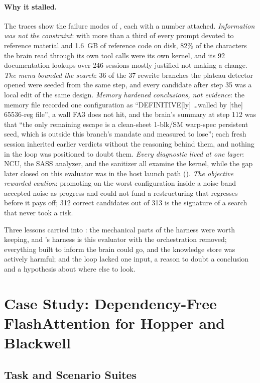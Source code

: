\paragraph{Why it stalled.} The traces show the failure modes of , each with a
number attached. \emph{Information was not the constraint}: with more than a third of every prompt
devoted to reference material and 1.6~GB of reference code on disk, 82\% of the characters the brain
read through its own tool calls were its own kernel, and its 92 documentation lookups over 246
sessions mostly justified not making a change. \emph{The menu bounded the search}: 36 of the 37
rewrite branches the plateau detector opened were seeded from the same step, and every candidate
after step 35 was a local edit of the same design. \emph{Memory hardened conclusions, not evidence}:
the memory file recorded one configuration as ``DEFINITIVE[ly] \ldots walled by [the] 65536-reg
file'', a wall FA3 does not hit, and the brain's summary at step 112 was that ``the only remaining
escape is a clean-sheet 1-blk/SM warp-spec persistent seed, which is outside this branch's mandate
and measured to lose''; each fresh session inherited earlier verdicts without the reasoning behind
them, and nothing in the loop was positioned to doubt them. \emph{Every diagnostic lived at one
layer}: NCU, the SASS analyzer, and the sanitizer all examine the kernel, while the gap \KernelSeek later
closed on this evaluator was in the host launch path (). \emph{The objective
rewarded caution}: promoting on the worst configuration inside a noise band accepted noise as
progress and could not fund a restructuring that regresses before it pays off; 312 correct
candidates out of 313 is the signature of a search that never took a risk.

Three lessons carried into \KernelSeek: the mechanical parts of the harness were worth keeping, and
\KernelSeek's harness is this evaluator with the orchestration removed; everything built to inform the
brain could go, and the knowledge store was actively harmful; and the loop lacked one input, a
reason to doubt a conclusion and a hypothesis about where else to look.

\section{Case Study: Dependency-Free FlashAttention for Hopper and Blackwell}
\label{kernelseek:sec:kernels}

\subsection{Task and Scenario Suites}
\label{kernelseek:sec:kernels-task}

